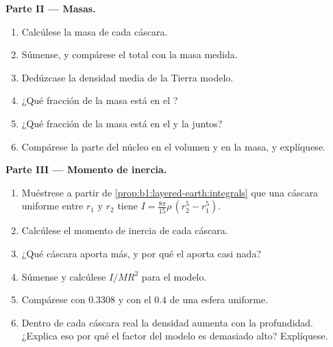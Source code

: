 \begin{problem}
\noindent\textbf{Parte II --- Masas.}
\begin{enumerate}[resume]
  \item Calcúlese la masa de cada cáscara.
  \item Súmense, y compárese el total con la masa medida.
  \item Dedúzcase la densidad media de la Tierra modelo.
  \item ¿Qué fracción de la masa está en el ?
  \item ¿Qué fracción de la masa está en el  y la  juntos?
  \item Compárese la parte del núcleo en el volumen y en la masa, y explíquese.
\end{enumerate}

\noindent\textbf{Parte III --- Momento de inercia.}
\begin{enumerate}[resume]
  \item Muéstrese a partir de \cref{prop:b1:layered-earth:integrals} que una cáscara uniforme entre $r_1$ y $r_2$ tiene
        $I = \tfrac{8\pi}{15}\rho\,(r_2^5 - r_1^5)$.
  \item Calcúlese el momento de inercia de cada cáscara.
  \item ¿Qué cáscara aporta más, y por qué el  aporta casi nada?
  \item Súmense y calcúlese $I/MR^2$ para el modelo.
  \item Compárese con $0.3308$ y con el $0.4$ de una esfera uniforme.
  \item Dentro de cada cáscara real la densidad aumenta con la profundidad. ¿Explica eso por qué el factor del modelo es demasiado
        alto? Explíquese.
\end{enumerate}


\end{problem}
